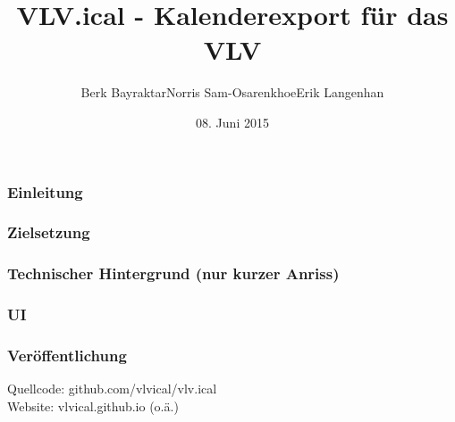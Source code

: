 \documentclass[10pt]{beamer}
\author{Berk Bayraktar\quad Norris Sam-Osarenkhoe\quad Erik Langenhan}
\title[VLV.ical]{VLV.ical - Kalenderexport für das VLV}
\date{08. Juni 2015}
\begin{document}
\frame{\titlepage}

\begin{frame}
    \frametitle{Einleitung}
    
\end{frame}

\begin{frame}
    \frametitle{Zielsetzung}
\end{frame}

\begin{frame}
    \frametitle{Technischer Hintergrund (nur kurzer Anriss)}
\end{frame}

\begin{frame}
    \frametitle{UI}
\end{frame}

\begin{frame}
    \frametitle{Veröffentlichung}
    Quellcode: github.com/vlvical/vlv.ical \\
    Website: vlvical.github.io (o.ä.)
\end{frame}
\end{document}
